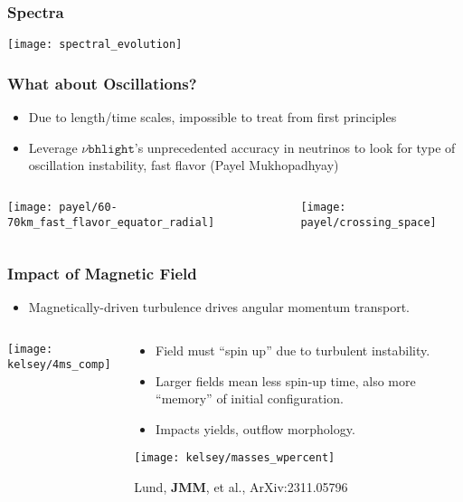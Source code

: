 \documentclass[]{beamer}
\begin{document}
\begin{frame}
  \frametitle{Spectra}
  \begin{center}
    \texttt{[image: spectral\_evolution]}
  \end{center}
\end{frame}

\begin{frame}
  \frametitle{What about Oscillations?}
  \begin{itemize}
  \item Due to length/time scales, impossible to treat from first principles
  \item Leverage $\nu\texttt{bhlight}$'s unprecedented accuracy in neutrinos to look for type of oscillation instability, fast flavor (Payel Mukhopadhyay)
  \end{itemize}
  \begin{columns}
    \begin{column}{6cm}
      \begin{center}
        \texttt{[image: payel/60-70km\_fast\_flavor\_equator\_radial]}
      \end{center}
    \end{column}
    \begin{column}{6cm}
      \begin{center}
        \texttt{[image: payel/crossing\_space]}
      \end{center}
    \end{column}
  \end{columns}
\end{frame}

\begin{frame}
  \frametitle{Impact of Magnetic Field}
  \begin{itemize}
  \item Magnetically-driven turbulence drives angular momentum transport.
  \end{itemize}
  \begin{columns}
    \begin{column}{2.5cm}
      \begin{center}
        \texttt{[image: kelsey/4ms\_comp]}
      \end{center}
    \end{column}
    \begin{column}{9.5cm}
      \begin{itemize}
      \item Field must ``spin up'' due to turbulent instability.
      \item Larger fields mean less spin-up time, also more ``memory''
        of initial configuration.
      \item Impacts yields, outflow morphology.
      \end{itemize}
      \begin{center}
        \texttt{[image: kelsey/masses\_wpercent]}
      \end{center}
      {\footnotesize Lund, \textbf{JMM}, et al., ArXiv:2311.05796}
    \end{column}
  \end{columns}
\end{frame}
\end{document}

